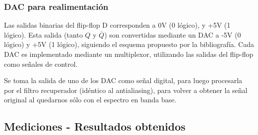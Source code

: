 \documentclass[assd_tp3_main.tex]{subfiles}
\begin{document}
\subsubsection{DAC para realimentación}

Las salidas binarias del flip-flop D corresponden a 0V (0 lógico), y +5V (1 lógico). Esta salida (tanto $Q$ y $\overline{Q}$) son convertidas mediante un DAC a -5V (0 lógico) y +5V (1 lógico), siguiendo el esquema propuesto por la bibliografía. Cada DAC es implementado mediante un multiplexor, utilizando las salidas del flip-flop como señales de control.


Se toma la salida de uno de los DAC como señal digital, para luego procesarla por el filtro recuperador (idéntico al antialiasing), para volver a obtener la señal original al quedarnos sólo con el espectro en banda base.

\subsection{Mediciones - Resultados obtenidos}

\end{document}
